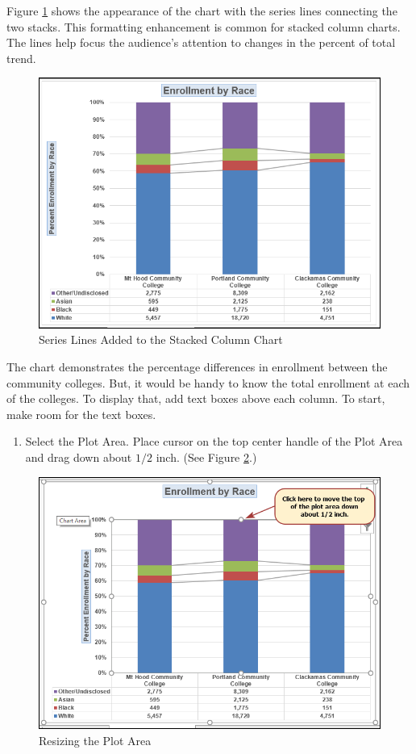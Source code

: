 Figure \ref{04:fig41} shows the appearance of the chart with the series lines connecting the two stacks. This formatting enhancement is common for stacked column charts. The lines help focus the audience's attention to changes in the percent of total trend.

\begin{figure}[H]
	\centering
	\includegraphics[width=\maxwidth{.95\linewidth}]{gfx/ch04_fig41}
	\caption{Series Lines Added to the Stacked Column Chart}
	\label{04:fig41}
\end{figure}

The chart demonstrates the percentage differences in enrollment between the community colleges. But, it would be handy to know the total enrollment at each of the colleges. To display that, add text boxes above each column. To start, make room for the text boxes.

\begin{enumerate}
	\item Select the Plot Area. Place cursor on the top center handle of the Plot Area and drag down about $ 1/2 $ inch. (See Figure \ref{04:fig42}.)
\end{enumerate}

\begin{figure}[H]
	\centering
	\includegraphics[width=\maxwidth{.95\linewidth}]{gfx/ch04_fig42}
	\caption{Resizing the Plot Area}
	\label{04:fig42}
\end{figure}

